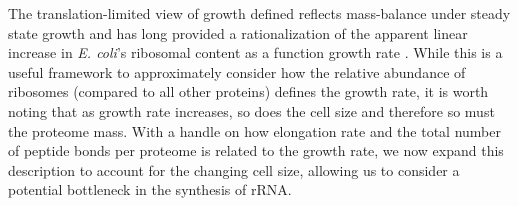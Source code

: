 The translation-limited view of growth defined  reflects
mass-balance under steady state growth and has long provided a rationalization
of the apparent linear increase in \textit{E. coli}'s ribosomal content as a
function growth rate \cite{goldberger1979,schaechter1958,scott2010}. While this
is a useful framework to approximately consider how the relative abundance of ribosomes
(compared to all other proteins) defines the growth rate, it is worth noting
that as growth rate increases, so does the cell size and therefore so must the
proteome mass. With a handle on how elongation rate and the total number of
peptide bonds per proteome is related to the growth rate, we now expand this
description to account for the changing cell size, allowing us to consider a
potential bottleneck in the synthesis of rRNA.



